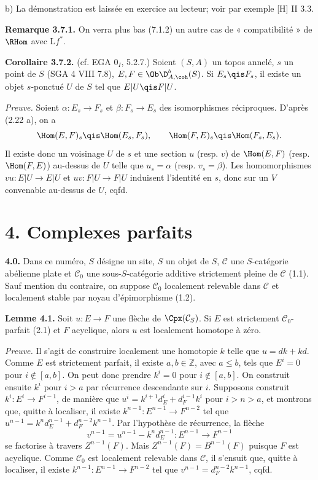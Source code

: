 \documentclass[11pt]{article}
\begin{document}
b) La démonstration est laissée en exercice au lecteur; voir par exemple [H] II 3.3.

\textbf{Remarque 3.7.1.} On verra plus bas (7.1.2) un autre cas de « compatibilité » de \(\RHom\) avec \(\mathrm Lf^*\).

\textbf{Corollaire 3.7.2.} (cf. EGA \(0_I\), 5.2.7.) Soient \((S,A)\) un topos annelé, \(s\) un point de \(S\) (SGA 4 VIII 7.8), \(E,F\in\Ob\D^b_{A,\coh}(S)\). Si \(E_s\qis F_s\), il existe un objet \(s\)-ponctué \(U\) de \(S\) tel que \(E|U\qis F|U\).

\emph{Preuve.} Soient \(\alpha:E_s\to F_s\) et \(\beta:F_s\to E_s\) des isomorphismes réciproques. D'après (2.22 a), on a
\[
  \Hom(E,F)_s\qis\Hom(E_s,F_s),
  \qquad
  \Hom(F,E)_s\qis\Hom(F_s,E_s).
\]
Il existe donc un voisinage \(U\) de \(s\) et une section \(u\) (resp. \(v\)) de \(\Hom(E,F)\) (resp. \(\Hom(F,E)\)) au-dessus de \(U\) telle que \(u_s=\alpha\) (resp. \(v_s=\beta\)). Les homomorphismes \(vu:E|U\to E|U\) et \(uv:F|U\to F|U\) induisent l'identité en \(s\), donc sur un \(V\) convenable au-dessus de \(U\), cqfd.

\section*{4. Complexes parfaits}

\textbf{4.0.} Dans ce numéro, \(S\) désigne un site, \(S\) un objet de \(S\), \(\mathcal C\) une \(S\)-catégorie abélienne plate et \(\mathcal C_0\) une sous-\(S\)-catégorie additive strictement pleine de \(\mathcal C\) (1.1). Sauf mention du contraire, on suppose \(\mathcal C_0\) localement relevable dans \(\mathcal C\) et localement stable par noyau d'épimorphisme (1.2).

\textbf{Lemme 4.1.} Soit \(u:E\to F\) une flèche de \(\Cpx(\mathcal C_S)\). Si \(E\) est strictement \(\mathcal C_0\)-parfait (2.1) et \(F\) acyclique, alors \(u\) est localement homotope à zéro.

\emph{Preuve.} Il s'agit de construire localement une homotopie \(k\) telle que \(u=dk+kd\). Comme \(E\) est strictement parfait, il existe \(a,b\in\mathbb Z\), avec \(a\leq b\), tels que \(E^i=0\) pour \(i\notin[a,b]\). On peut donc prendre \(k^i=0\) pour \(i\notin[a,b]\). On construit ensuite \(k^i\) pour \(i>a\) par récurrence descendante sur \(i\). Supposons construit \(k^i:E^i\to F^{i-1}\), de manière que \(u^i=k^{i+1}d_E^i+d_F^{i-1}k^i\) pour \(i>n>a\), et montrons que, quitte à localiser, il existe \(k^{n-1}:E^{n-1}\to F^{n-2}\) tel que \(u^{n-1}=k^nd_E^{n-1}+d_F^{n-2}k^{n-1}\). Par l'hypothèse de récurrence, la flèche
\[
  v^{n-1}=u^{n-1}-k^nd_E^{n-1}:E^{n-1}\to F^{n-1}
\]
se factorise à travers \(Z^{n-1}(F)\). Mais \(Z^{n-1}(F)=B^{n-1}(F)\) puisque \(F\) est acyclique. Comme \(\mathcal C_0\) est localement relevable dans \(\mathcal C\), il s'ensuit que, quitte à localiser, il existe \(k^{n-1}:E^{n-1}\to F^{n-2}\) tel que \(v^{n-1}=d_F^{n-2}k^{n-1}\), cqfd.
\end{document}
